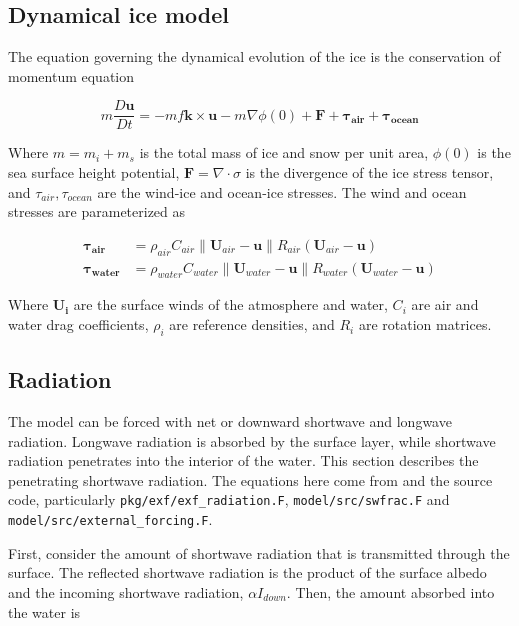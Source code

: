 \documentclass[11pt]{article}
\begin{document}
\subsection{Dynamical ice model}
\label{sec:iceDynamics}
The equation governing the dynamical evolution of the ice is the conservation of momentum equation

\begin{equation}
m \frac{D \mathbf{u}}{D t} = -m f \mathbf{k}\times \mathbf{u} - m\nabla \phi(0) + \mathbf{F} + \mathbf{\tau_{air}} + \mathbf{\tau_{ocean}}
\end{equation}

Where  $m = m_i + m_s$ is the total mass of ice and snow per unit area, $\phi(0)$ is the sea surface height potential, $\mathbf{F} = \nabla \cdot \sigma$ is the divergence of the ice stress tensor, and $\tau_{air}, \tau_{ocean}$ are the wind-ice and ocean-ice stresses. The wind and ocean stresses are parameterized as

\begin{equation}
\begin{aligned}
\mathbf{\tau_{air}} &= \rho_{air}C_{air}\left \| \mathbf{U}_{air} - \mathbf{u} \right \| R_{air}\left(\mathbf{U}_{air} - \mathbf{u}\right) \\
\mathbf{\tau_{water}} &= \rho_{water}C_{water}\left \| \mathbf{U}_{water} - \mathbf{u} \right \| R_{water}\left(\mathbf{U}_{water} - \mathbf{u}\right)
\end{aligned}
\end{equation}

Where $\mathbf{U_i}$ are the surface winds of the atmosphere and water, $C_i$ are air and water drag coefficients, $\rho_i$ are reference densities, and $R_i$ are rotation matrices.

\subsection{Radiation}
The model can be forced with net or downward shortwave and longwave radiation. Longwave radiation is absorbed by the surface layer, while shortwave radiation penetrates into the interior of the water. This section describes the penetrating shortwave radiation. The equations here come from \cite{PaulsonSimpson1977} and the source code, particularly \verb|pkg/exf/exf_radiation.F|, \verb|model/src/swfrac.F| and \verb|model/src/external_forcing.F|.

First, consider the amount of shortwave radiation that is transmitted through the surface. The reflected shortwave radiation is the product of the surface albedo and the incoming shortwave radiation, $\alpha I_{down}$. Then, the amount absorbed into the water is
\end{document}
